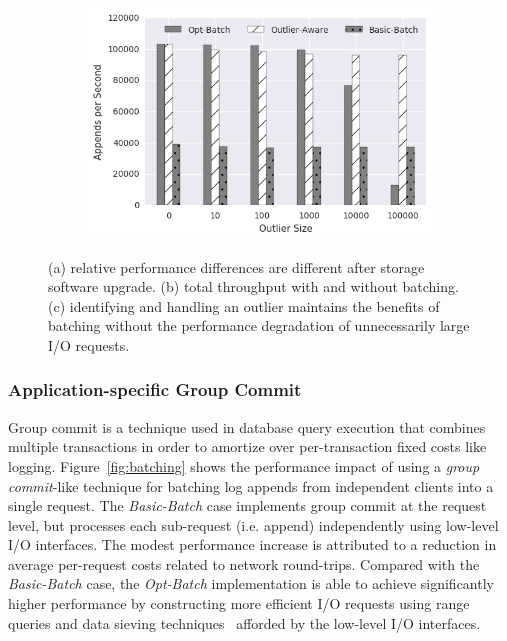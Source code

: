 \begin{figure}[t]
\begin{subfigure}[b]{.3\linewidth}
        \includegraphics[width=1.0\linewidth]{batching-outlier-detect.png}
        \caption{}
        \label{fig:batching-outlier}
    \end{subfigure}
    \caption{(a) relative performance differences are different after storage
    software upgrade. (b) total throughput with and without batching. (c)
    identifying and handling an outlier maintains the benefits
    of batching without the performance degradation of unnecessarily large I/O
    requests.}
\end{figure}

\subsubsection{Application-specific Group Commit}
\label{sec:batch}

Group commit is a technique used in database query execution that combines
multiple transactions in order to amortize over per-transaction fixed costs
like logging. Figure~\ref{fig:batching} shows the performance impact of using
a \emph{group commit}-like technique for batching log appends from independent
clients into a single request. The \emph{Basic-Batch} case implements group
commit at the request level, but processes each sub-request (i.e. append)
independently using low-level I/O interfaces. The modest performance increase
is attributed to a reduction in average per-request costs related to network
round-trips. Compared with the \emph{Basic-Batch} case, the \emph{Opt-Batch}
implementation is able to achieve significantly higher performance by
constructing more efficient I/O requests using range queries and data sieving
techniques~\cite{750599} afforded by the low-level I/O interfaces.

